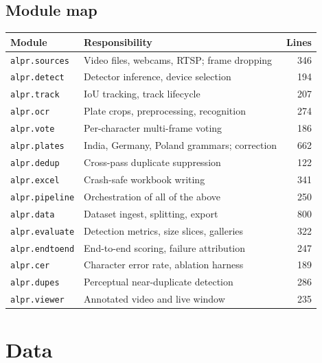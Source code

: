 \documentclass[11pt,a4paper]{article}
\begin{document}
\subsection{Module map}

\begin{center}
\small
\begin{tabular}{@{}llr@{}}
\toprule
\textbf{Module} & \textbf{Responsibility} & \textbf{Lines} \\
\midrule
\texttt{alpr.sources}   & Video files, webcams, RTSP; frame dropping    & 346 \\
\texttt{alpr.detect}    & Detector inference, device selection          & 194 \\
\texttt{alpr.track}     & IoU tracking, track lifecycle                 & 207 \\
\texttt{alpr.ocr}       & Plate crops, preprocessing, recognition       & 274 \\
\texttt{alpr.vote}      & Per-character multi-frame voting              & 186 \\
\texttt{alpr.plates}    & India, Germany, Poland grammars; correction   & 662 \\
\texttt{alpr.dedup}     & Cross-pass duplicate suppression              & 122 \\
\texttt{alpr.excel}     & Crash-safe workbook writing                   & 341 \\
\texttt{alpr.pipeline}  & Orchestration of all of the above             & 250 \\
\texttt{alpr.data}      & Dataset ingest, splitting, export             & 800 \\
\texttt{alpr.evaluate}  & Detection metrics, size slices, galleries     & 322 \\
\texttt{alpr.endtoend}  & End-to-end scoring, failure attribution       & 247 \\
\texttt{alpr.cer}       & Character error rate, ablation harness        & 189 \\
\texttt{alpr.dupes}     & Perceptual near-duplicate detection           & 286 \\
\texttt{alpr.viewer}    & Annotated video and live window               & 235 \\
\bottomrule
\end{tabular}
\end{center}

\newpage
\section{Data}
\end{document}
